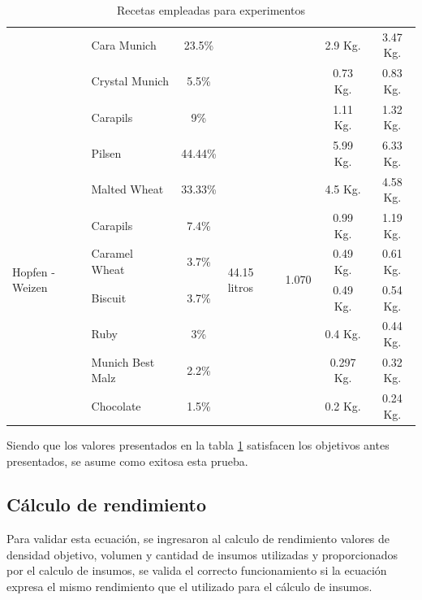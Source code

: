 \begin{table}[H]
\begin{tabularx}{\textwidth}{|X|X|X|X|X|X|X|}
         & Cara Munich & \multicolumn{1}{c|}{23.5\%} & & &\multicolumn{1}{c|}{2.9 Kg.} &\multicolumn{1}{c|}{3.47 Kg.} \\
        & Crystal Munich & \multicolumn{1}{c|}{5.5\%} & & &\multicolumn{1}{c|}{0.73 Kg.} &\multicolumn{1}{c|}{0.83 Kg.} \\
        & Carapils & \multicolumn{1}{c|}{9\%} & & &\multicolumn{1}{c|}{1.11 Kg.} &\multicolumn{1}{c|}{1.32 Kg.} \\
        \hline
        \multirow{8}{2cm}{Hopfen - Weizen} & Pilsen &\multicolumn{1}{c|}{44.44\%}  &\multirow{8}{2cm}{44.15 litros}  &\multirow{8}{2cm}{1.070} & \multicolumn{1}{c|}{5.99 Kg.} & \multicolumn{1}{c|}{6.33 Kg.}\\
         & Malted Wheat & \multicolumn{1}{c|}{33.33\%} & & &\multicolumn{1}{c|}{4.5 Kg.} &\multicolumn{1}{c|}{4.58 Kg.} \\
         & Carapils & \multicolumn{1}{c|}{7.4\%} & & &\multicolumn{1}{c|}{0.99 Kg.} &\multicolumn{1}{c|}{1.19 Kg.} \\
         & Caramel Wheat & \multicolumn{1}{c|}{3.7\%} & & &\multicolumn{1}{c|}{0.49 Kg.} &\multicolumn{1}{c|}{0.61 Kg.} \\
         & Biscuit & \multicolumn{1}{c|}{3.7\%} & & &\multicolumn{1}{c|}{0.49 Kg.} &\multicolumn{1}{c|}{0.54 Kg.} \\
         & Ruby & \multicolumn{1}{c|}{3\%} & & &\multicolumn{1}{c|}{0.4 Kg.} &\multicolumn{1}{c|}{0.44 Kg.} \\
         & Munich Best Malz & \multicolumn{1}{c|}{2.2\%} & & &\multicolumn{1}{c|}{0.297 Kg.} &\multicolumn{1}{c|}{0.32 Kg.} \\
         & Chocolate & \multicolumn{1}{c|}{1.5\%} & & &\multicolumn{1}{c|}{0.2 Kg.} &\multicolumn{1}{c|}{0.24 Kg.} \\
        \hline
    \end{tabularx}
    \caption{Recetas empleadas para experimentos}
    \label{tab:TablaRecetaExperimentos}
\end{table}
\par Siendo que los valores presentados en la tabla \ref{tab:TablaRecetaExperimentos} satisfacen los objetivos antes presentados, se asume como exitosa esta prueba.

\subsection{Cálculo de rendimiento}
Para validar esta ecuación, se ingresaron al calculo de rendimiento valores de densidad objetivo, volumen y cantidad de insumos utilizadas y proporcionados por el calculo de insumos, se valida el correcto funcionamiento si la ecuación expresa el mismo rendimiento que el utilizado para el cálculo de insumos.

